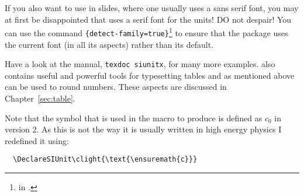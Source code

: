 If you also want to use  in slides, where one usually
uses a sans serif font, you may at first be disappointed that
 uses a serif font for the units! DO not despair!
You can use the command
\texttt{\{detect-family=true\}}\footnote{
  in .} to ensure that the package uses the current font
(in all its aspects) rather than its default.

Have a look at the manual, \texttt{texdoc siunitx}, for many more
examples.  also contains useful and powerful tools
for typesetting tables and as mentioned above can be used to round
numbers. These aspects are discussed in Chapter~\ref{sec:table}.

Note that the  symbol that is used in the macro
 to produce \si{\MeVovercsq} is defined as $c_{0}$ in
 version 2. As this is not the way it is usually
written in high energy physics I redefined it using:
\begin{verbatim}
  \DeclareSIUnit\clight{\text{\ensuremath{c}}}
\end{verbatim}

